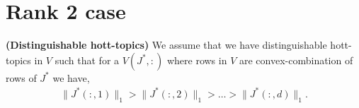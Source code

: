 

\section{Rank 2 case}

\begin{assumption} \textbf{(Distinguishable hott-topics)}
We assume that we have distinguishable hott-topics in $V$ such that for a  $V(J^*,:)$ where rows in $V$ are convex-combination of rows of $J^*$ we have,
\begin{align*}
\|J^*(:,1)\|_1 > \|J^*(:,2)\|_1 > \ldots > \|J^*(:,d)\|_1 .
\end{align*}
\end{assumption}


